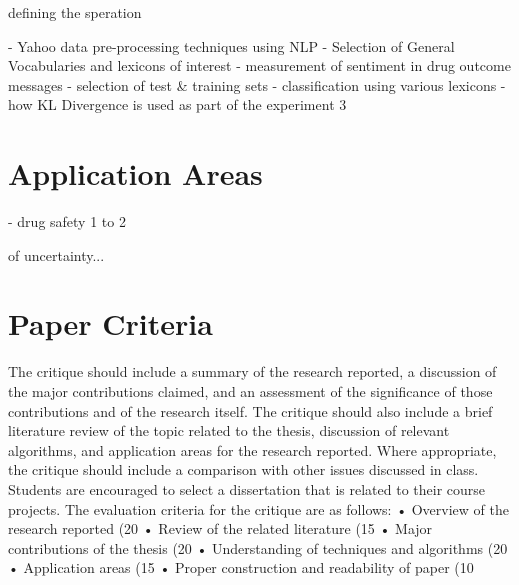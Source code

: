 \documentclass[twoside,11pt]{article}
\begin{document}
defining the speration

- Yahoo data pre-processing techniques using NLP
- Selection of General Vocabularies and lexicons of interest
- measurement of sentiment in drug outcome messages
- selection of test & training sets
- classification using various lexicons
- how KL Divergence is used as part of the experiment
3


\section{Application Areas}
- drug safety
1 to 2



of uncertainty...\\

\section{Paper Criteria}
The critique should include a summary of the research reported, a discussion of the major contributions
claimed, and an assessment of the significance of those contributions and of the research itself. The
critique should also include a brief literature review of the topic related to the thesis, discussion of relevant
algorithms, and application areas for the research reported. Where appropriate, the critique should
include a comparison with other issues discussed in class. Students are encouraged to select a
dissertation that is related to their course projects.
The evaluation criteria for the critique are as follows:
• Overview of the research reported (20%
• Review of the related literature (15%
• Major contributions of the thesis (20%
• Understanding of techniques and algorithms (20%
• Application areas (15%
• Proper construction and readability of paper (10%



\newpage




\vskip 0.2in

\end{document}
